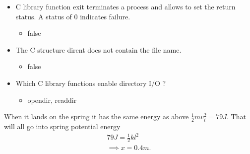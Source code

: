 \documentclass{report}
\begin{document}
\begin{itemize}
        \item C library function exit terminates a process and allows to set the return status. A status of 0 indicates failure.
            \begin{itemize}
                \item false
            \end{itemize}
        \item The C structure dirent does not contain the file name.
            \begin{itemize}
                \item false
            \end{itemize}
        \item Which C library functions enable directory I/O ?
            \begin{itemize}
                \item opendir, readdir 
            \end{itemize}
    \end{itemize}

    When it lands on the spring it has the same energy as above $\frac{1}{2}mv_{i}^{2}  = 79 J$. That will all go into spring potential energy
    \begin{align*}
        79J = \frac{1}{2}kl^{2} \\
        \implies x = 0.4m
    .\end{align*}
\end{document}

